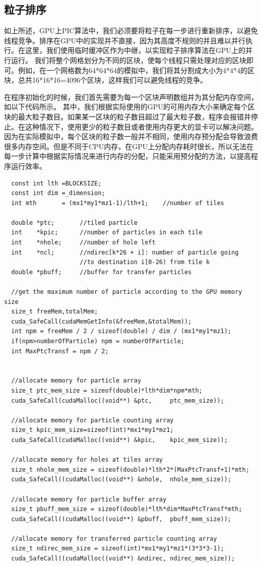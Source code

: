 \subsection{粒子排序}
\label{section:PIC_GPU_reorder}
如上所述，GPU上PIC算法中，我们必须要将粒子在每一步进行重新排序，以避免线程竞争。排序在GPU中的实现并不直接，因为其高度不规则的并且难以并行执行。在这里，我们使用临时缓冲区作为中继，以实现粒子排序算法在GPU上的并行运行。
我们将整个网格划分为不同的区块，使每个线程只需处理对应的区块即可。例如，在一个网格数为64*64*64的模拟中，我们将其分割成大小为4*4*4的区块，总共16*16*16=4096个区块，这样我们可以避免线程的竞争。

在程序初始化的时候，我们首先需要为每一个区块声明数组并为其分配内存空间，如以下代码所示。
其中，我们根据实际使用的GPU的可用内存大小来确定每个区块的最大粒子数目。如果某一区块的粒子数目超过了最大粒子数，程序会报错并停止。在这种情况下，使用更少的粒子数目或者使用内存更大的显卡可以解决问题。
因为在实际模拟中，每个区块的粒子数一般并不相同，使用内存预分配会导致浪费很多内存空间。但是不同于CPU内存，在GPU上分配内存耗时很长，所以无法在每一步计算中根据实际情况来进行内存的分配，只能采用预分配的方法，以提高程序运行效率。
\begin{lstlisting}
  const int lth =BLOCKSIZE;
  const int dim =_dimension;
  int mth       = (mx1*my1*mz1-1)/lth+1;    //number of tiles

  double *ptc;       //tiled particle
  int    *kpic;      //number of particles in each tile
  int    *nhole;     //number of hole left
  int    *ncl;       //ndirec[k*26 + i]: number of particle going
                     //to destination i[0-26) from tile k
  double *pbuff;     //buffer for transfer particles

  //get the maximum number of particle according to the GPU memory size
  size_t freeMem,totalMem;
  cuda_SafeCall(cudaMemGetInfo(&freeMem,&totalMem));
  int npm = freeMem / 2 / sizeof(double) / dim / (mx1*my1*mz1);
  if(npm>numberOfParticle) npm = numberOfParticle;
  int MaxPtcTransf = npm / 2;


  //allocate memory for particle array
  size_t ptc_mem_size = sizeof(double)*lth*dim*npm*mth;
  cuda_SafeCall(cudaMalloc((void**) &ptc,     ptc_mem_size));

  //allocate memory for particle counting array
  size_t kpic_mem_size=sizeof(int)*mx1*my1*mz1;
  cuda_SafeCall(cudaMalloc((void**) &kpic,    kpic_mem_size));

  //allocate memory for holes at tiles array
  size_t nhole_mem_size = sizeof(double)*lth*2*(MaxPtcTransf+1)*mth;
  cuda_SafeCall((cudaMalloc((void**) &nhole,  nhole_mem_size));

  //allocate memory for particle buffer array
  size_t pbuff_mem_size = sizeof(double)*lth*dim*MaxPtcTransf*mth;
  cuda_SafeCall((cudaMalloc((void**) &pbuff,  pbuff_mem_size));

  //allocate memory for transferred particle counting array
  size_t ndirec_mem_size = sizeof(int)*mx1*my1*mz1*(3*3*3-1);
  cuda_SafeCall((cudaMalloc((void**) &ndirec, ndirec_mem_size));
\end{lstlisting}


